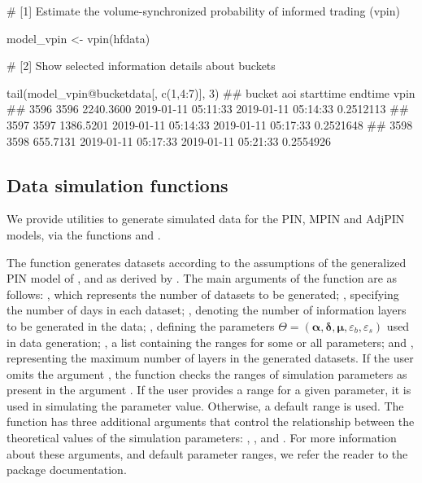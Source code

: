 \begin{example}
# [1] Estimate the volume-synchronized probability of informed trading (vpin)  

model_vpin <- vpin(hfdata)
\end{example}

\begin{example}
# [2] Show selected information details about buckets

tail(model_vpin@bucketdata[, c(1,4:7)], 3)
##      bucket       aoi           starttime             endtime      vpin
## 3596   3596 2240.3600 2019-01-11 05:11:33 2019-01-11 05:14:33 0.2512113
## 3597   3597 1386.5201 2019-01-11 05:14:33 2019-01-11 05:17:33 0.2521648
## 3598   3598  655.7131 2019-01-11 05:17:33 2019-01-11 05:21:33 0.2554926
\end{example}

\subsection{Data simulation functions}

We provide utilities to generate simulated data for the PIN, MPIN and AdjPIN models, via the functions  and .

The function  generates datasets according to the assumptions of the generalized PIN model of \cite{easley1992time}, and \cite{easley1996liquidity} as derived by \cite{ersan2016multilayer}. The main arguments of the function are as follows: , which represents the number of datasets to be generated; , specifying the number of days in each dataset; , denoting the number of information layers to be generated in the data; , defining the parameters \(\Theta=\left(\boldsymbol{\alpha },\boldsymbol{\delta },\boldsymbol{\mu },\varepsilon_{b},\varepsilon_{s}\right)\) used in data generation; , a list containing the ranges for some or all parameters; and , representing the maximum number of layers in the generated datasets. If the user omits the argument , the function checks the ranges of simulation parameters as present in the argument . If the user provides a range for a given parameter, it is used in simulating the parameter value. Otherwise, a default range is used. The function  has three additional arguments that control the relationship between the theoretical values of the simulation parameters: , , and . For more information about these arguments, and default parameter ranges, we refer the reader to the package documentation.

